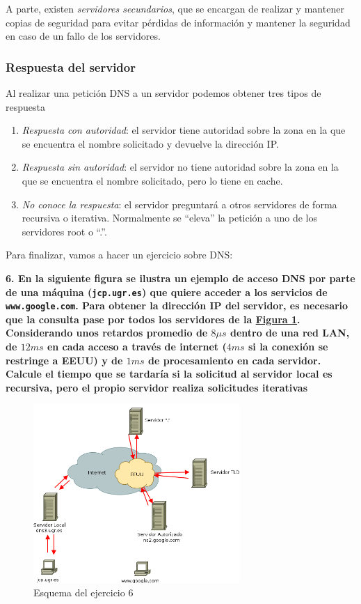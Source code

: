 \documentclass[10pt,a4paper,spanish]{report}
\begin{document}
A parte, existen \textit{\textcolor{tema2}{servidores secundarios}}, que se encargan de realizar y mantener copias de seguridad para evitar pérdidas de información y mantener la seguridad en caso de un fallo de los servidores.

\subsubsection{\textcolor{tema2}Respuesta del servidor}
Al realizar una petición DNS a un servidor podemos obtener tres tipos de respuesta
\begin{enumerate}[\color{tema2}{$\bigstar$}]
  \item \textit{\textcolor{tema2}{Respuesta con autoridad}}: el servidor tiene autoridad sobre la zona en la que se encuentra el nombre solicitado y devuelve la dirección IP.

  \item \textit{\textcolor{tema2}{Respuesta sin autoridad}}: el servidor no tiene autoridad sobre la zona en la que se encuentra el nombre solicitado, pero lo tiene en cache.

  \item \textit{\textcolor{tema2}{No conoce la respuesta}}: el servidor preguntará a otros servidores de forma recursiva o iterativa. Normalmente se ``eleva'' la petición a uno de los servidores root o ``.''.
\end{enumerate}

Para finalizar, vamos a hacer un ejercicio sobre DNS:

\textbf{6. En la siguiente figura se ilustra un ejemplo de acceso DNS por parte de una máquina (\texttt{jcp.ugr.es}) que quiere acceder a los servicios de \texttt{www.google.com}. Para obtener la dirección IP del servidor, es necesario que la consulta pase por todos los servidores de la \hyperref[ejDNS]{Figura \ref*{ejDNS}}. Considerando unos retardos promedio de $8 \mu s$ dentro de una red LAN, de $12 ms$ en cada acceso a través de internet ($4 ms$ si la conexión se restringe a EEUU) y de $1 ms$ de procesamiento en cada servidor. Calcule el tiempo que se tardaría si la solicitud al servidor local es recursiva, pero el propio servidor realiza solicitudes iterativas}

\begin{figure}[!h]
  \centering
  \includegraphics[width=0.7\textwidth]{ejDNS}
  \caption{Esquema del ejercicio 6}
  \label{ejDNS}
\end{figure}
\end{document}
